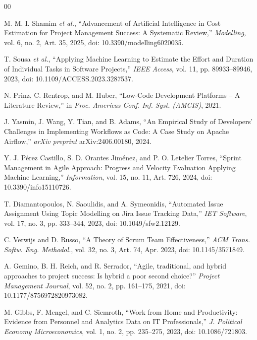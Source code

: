 \documentclass[conference]{IEEEtran}
\begin{document}
\begin{thebibliography}{00}


M. M. I. Shamim \textit{et al.},
``Advancement of Artificial Intelligence in Cost Estimation for Project Management Success: A Systematic Review,''
\textit{Modelling}, vol. 6, no. 2, Art. 35, 2025,
doi: 10.3390/modelling6020035.

T. Sousa \textit{et al.}, ``Applying Machine Learning to Estimate the Effort and Duration of Individual Tasks in Software Projects,''
\textit{IEEE Access}, vol. 11, pp. 89933--89946, 2023,
doi: 10.1109/ACCESS.2023.3287537.

N. Prinz, C. Rentrop, and M. Huber, ``Low-Code Development Platforms -- A Literature Review,''
in \textit{Proc. Americas Conf. Inf. Syst. (AMCIS)}, 2021.

J. Yasmin, J. Wang, Y. Tian, and B. Adams, ``An Empirical Study of Developers' Challenges in Implementing Workflows as Code: A Case Study on Apache Airflow,''
\textit{arXiv preprint} arXiv:2406.00180, 2024.

Y. J. P\'erez Castillo, S. D. Orantes Jim\'enez, and P. O. Letelier Torres,
``Sprint Management in Agile Approach: Progress and Velocity Evaluation Applying Machine Learning,''
\textit{Information}, vol. 15, no. 11, Art. 726, 2024,
doi: 10.3390/info15110726.

T. Diamantopoulos, N. Saoulidis, and A. Symeonidis,
``Automated Issue Assignment Using Topic Modelling on Jira Issue Tracking Data,''
\textit{IET Software}, vol. 17, no. 3, pp. 333--344, 2023,
doi: 10.1049/sfw2.12129.


C. Verwijs and D. Russo, ``A Theory of Scrum Team Effectiveness,''
\textit{ACM Trans. Softw. Eng. Methodol.}, vol. 32, no. 3, Art. 74, Apr. 2023,
doi: 10.1145/3571849.

A. Gemino, B. H. Reich, and R. Serrador, ``Agile, traditional, and hybrid approaches to project success: Is hybrid a poor second choice?''
\textit{Project Management Journal}, vol. 52, no. 2, pp. 161--175, 2021,
doi: 10.1177/8756972820973082.

M. Gibbs, F. Mengel, and C. Siemroth, ``Work from Home and Productivity: Evidence from Personnel and Analytics Data on IT Professionals,''
\textit{J. Political Economy Microeconomics}, vol. 1, no. 2, pp. 235--275, 2023,
doi: 10.1086/721803.


\end{thebibliography}
\end{document}
